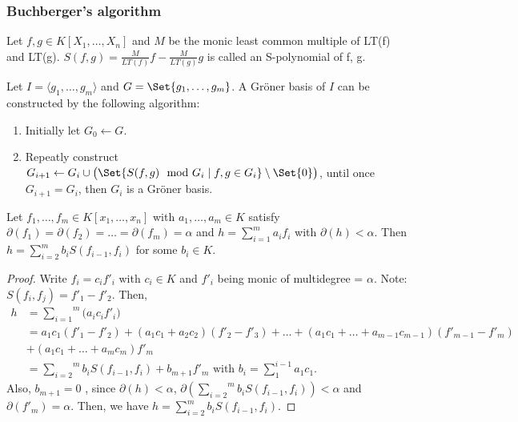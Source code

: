 \subsubsection{Buchberger's algorithm}

\begin{definition}
  Let $f,g \in K[X_1,\dots,X_n]$ and $M$ be the monic least common multiple of LT(f) and LT(g). $S(f,g) = \frac{M}{LT(f)}f- \frac{M}{LT(g)}g$ is called an S-polynomial of f, g.
\end{definition}

Let $I = \langle g_1, \dots, g_m \rangle$ and $G = \Set{ g_1, \dots, g_m }$.
A Gr\"{o}ner basis of $I$ can be constructed by the following algorithm:
\begin{enumerate}
  \item Initially let $G_0 \gets G$.
  \item Repeatly construct $G_{i+1} \gets G_i \cup \big( \Set{S(f, g) \mod G_i \mid f, g \in G_i} \setminus \Set{0} \big)$,
    until once $G_{i+1} = G_i$, then $G_i$ is a Gr\"{o}ner basis.
\end{enumerate}

\begin{lemma} \label{lemma:sum-of-equal-degree-f-is-less}
  Let $f_1, \dots, f_m \in K[x_1, \dots, x_n]$ with $a_1, \dots, a_m \in K$ satisfy
  $\partial(f_1) = \partial(f_2) = \dots = \partial(f_m) = \alpha$ and $h =\sum_{i = 1}^m a_i f_i $ with $\partial(h) < \alpha$.
  Then $h = \sum_{i = 2}^m b_i S(f_{i-1}, f_i)$ for some $b_i \in K$.
  \begin{proof}
    Write $f_i = c_if'_i$ with $c_i \in K$ and $f'_i$ being monic of multidegree = $\alpha$. Note: $S(f_i, f_j) = f'_1 - f'_2$. Then, 
    \begin{equation}
      \begin{split}
        h &= \overset{m}{\underset{i = 1}{\sum}} \big( a_ic_if'_i \big) \\
        &= a_1c_1(f'_1-f'_2) + (a_1c_1+a_2c_2)(f'_2-f'_3) + \dots+ (a_1c_1 + \dots + a_{m-1}c_{m-1})(f'_{m-1}-f'_m) \\
        &+ (a_1c_1+\dots+a_mc_m)f'_m \\
        &= \overset{m}{\underset{i = 2}{\sum}}b_iS(f_{i-1},f_i) + b_{m+1}f'_m\text{ with }b_i = \sum_{1}^{i-1}a_1c_1.
      \end{split}
    \end{equation}
      Also, $b_{m+1} = 0$ , since $\partial(h) < \alpha$, $\partial(\overset{m}{\underset{i = 2}{\sum}}b_iS(f_{i-1},f_i) ) < \alpha$ and $\partial(f'_m) = \alpha$. Then, we have $h = \sum_{i = 2}^m b_i S(f_{i-1}, f_i)$.
  \end{proof}
\end{lemma}

